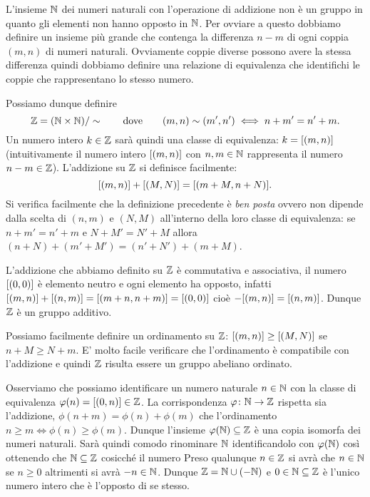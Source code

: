 L'insieme ${\mathbb N}$ dei numeri naturali con l'operazione di addizione 
non è un gruppo in quanto gli elementi non hanno opposto in ${\mathbb N}$.
Per ovviare a questo dobbiamo definire un insieme più grande che 
contenga la differenza $n-m$ di ogni coppia $(m,n)$ di numeri naturali.
Ovviamente coppie diverse possono avere la stessa differenza quindi 
dobbiamo definire una relazione di equivalenza che identifichi le coppie 
che rappresentano lo stesso numero. 

Possiamo dunque definire 
\[
  {\mathbb Z} = ({\mathbb N} \times {\mathbb N})/\sim
  \qquad\text{dove}\qquad
  (m,n)\sim (m',n')\iff n+m' = n'+m.
\]
Un numero intero $k\in {\mathbb Z}$ sarà quindi una classe di equivalenza:
$k = {\left[ (m,n) \right]}$ (intuitivamente il numero intero ${\left[ (m,n) \right]}$ 
con $n,m\in {\mathbb N}$ 
rappresenta il numero $n-m\in {\mathbb Z}$).
L'addizione su ${\mathbb Z}$ si definisce facilmente:
\[
 {\left[ (m,n) \right]}+{\left[ (M,N) \right]} = {\left[ (m+M,n+N) \right]}.
\]
Si verifica facilmente che la definizione precedente è \emph{ben posta}
ovvero non dipende dalla scelta di $(n,m)$ e $(N,M)$ all'interno 
della loro classe di equivalenza: se $n+m' = n'+m$ e $N+M'=N'+M$ 
allora $(n+N)+(m'+M')=(n'+N')+(m+M)$.

L'addizione che abbiamo definito su ${\mathbb Z}$ è commutativa e associativa, 
il numero ${\left[ (0,0) \right]}$
è elemento neutro e ogni elemento ha opposto, infatti 
${\left[ (m,n) \right]} + {\left[ (n,m) \right]} = {\left[ (m+n,n+m) \right]}={\left[ (0,0) \right]}$
cioè $-{\left[ (m,n) \right]}={\left[ (n,m) \right]}$.
Dunque ${\mathbb Z}$ è un gruppo additivo.

Possiamo facilmente definire un ordinamento su ${\mathbb Z}$:
${\left[ (m,n) \right]} \ge {\left[ (M,N) \right]}$ se 
$n+M\ge N+m$.
E' molto facile verificare che l'ordinamento è compatibile 
con l'addizione e quindi ${\mathbb Z}$ risulta essere un gruppo abeliano ordinato.

Osserviamo che possiamo identificare un numero naturale $n\in {\mathbb N}$ 
con la classe di equivalenza $\varphi(n) = {\left[ (0,n) \right]}\in {\mathbb Z}$.
La corrispondenza $\varphi\colon {\mathbb N}\to{\mathbb Z}$ rispetta sia l'addizione,
$\phi(n+m) = \phi(n)+\phi(m)$ che l'ordinamento $n\ge m \iff \phi(n)\ge \phi(m)$.
Dunque l'insieme $\varphi({\mathbb N})\subseteq {\mathbb Z}$ è una copia isomorfa dei 
numeri naturali. 
%
Sarà quindi comodo rinominare ${\mathbb N}$ identificandolo con $\varphi({\mathbb N})$ così 
ottenendo che ${\mathbb N}\subseteq {\mathbb Z}$ cosicché il numero 
Preso qualunque $n\in {\mathbb Z}$ si avrà che $n\in {\mathbb N}$ se $n\ge 0$ altrimenti 
si avrà $-n\in {\mathbb N}$. 
Dunque ${\mathbb Z} = {\mathbb N} \cup (-{\mathbb N})$ e $0\in {\mathbb N}\subseteq {\mathbb Z}$ 
è l'unico numero intero che è l'opposto di se stesso.

